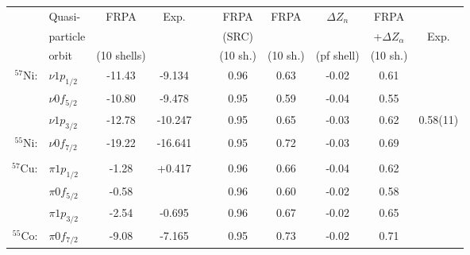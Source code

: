 \documentclass{ws-mpla}
\begin{document}
\begin{table}[h]
{\begin{tabular}{rlcccccccc}
\hline                        
\hline                        
         &  Quasi-  &  FRPA     &    Exp.\cite{toi.96}   &~&  FRPA     &    FRPA   & $\Delta Z_n$ & FRPA &    \\
         & particle &           &           &~&   (SRC)   &           &                   & +$\Delta Z_\alpha$  &  Exp.\cite{yur.06} \\
         &  orbit   &(10 shells)&            & &(10 sh.) &(10 sh.)&   (pf shell)      &  (10 sh.)      & \\
\hline                        
$^{57}$Ni:
& $\nu 1p_{1/2}$    &  -11.43   &  -9.134   & &   0.96    & 0.63      & -0.02             & 0.61     & \\
& $\nu 0f_{5/2}$    &  -10.80   &  -9.478   & &   0.95    & 0.59      & -0.04             & 0.55     & \\
& $\nu 1p_{3/2}$    &  -12.78   &  -10.247  & &   0.95    & 0.65      & -0.03             & 0.62    &   0.58(11) \\
$^{55}$Ni:
& $\nu 0f_{7/2}$    &  -19.22   &  -16.641  & &   0.95    & 0.72      & -0.03             & 0.69     &  \\
\\
$^{57}$Cu:
& $\pi 1p_{1/2}$    &   -1.28   &  +0.417   & &   0.96    & 0.66      & -0.04             & 0.62     & \\
& $\pi 0f_{5/2}$    &   -0.58   &           & &   0.96    & 0.60      & -0.02             & 0.58     &  \\
& $\pi 1p_{3/2}$    &   -2.54   &  -0.695   & &   0.96    & 0.67      & -0.02             & 0.65     &  \\
$^{55}$Co:
& $\pi 0f_{7/2}$    &   -9.08   &  -7.165   & &   0.95    & 0.73      & -0.02             & 0.71     &  \\
\hline                        
\hline                        
\end{tabular} }
\end{table}
\end{document}

